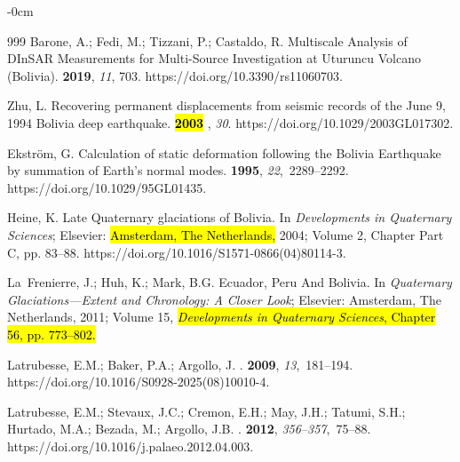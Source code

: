 \documentclass[data,article,accept,pdftex,moreauthors]{Definitions/mdpi}
\begin{document}
{\begin{adjustwidth}{-\extralength}{0cm}
\begin{thebibliography}{999}
Barone, A.; Fedi, M.; Tizzani, P.; Castaldo, R.
\newblock Multiscale Analysis of DInSAR Measurements for Multi-Source
 Investigation at Uturuncu Volcano (Bolivia).
 {\bf 2019}, {\em 11}, 703.
https://doi.org/10.3390/rs11060703.

Zhu, L.
\newblock Recovering permanent displacements from seismic records of the June
 9, 1994 Bolivia deep earthquake.
 {\bf \hl{2003}%
}, {\em 30}. https://doi.org/10.1029/2003GL017302.

Ekström, G.
\newblock Calculation of static deformation following the Bolivia Earthquake by
 summation of Earth's normal modes.
 {\bf 1995}, {\em 22},~2289--2292.
https://doi.org/10.1029/95GL01435.

Heine, K. {Late Quaternary glaciations of Bolivia}.
\newblock In {\em {Developments in Quaternary Sciences}}; Elsevier: \hl{Amsterdam, The Netherlands,} %
2004; Volume 2, Chapter {Part C}, pp. 83--88.
https://doi.org/10.1016/S1571-0866(04)80114-3.

La~Frenierre, J.; Huh, K.; Mark, B.G. Ecuador, Peru And Bolivia.
\newblock In {\em {Quaternary Glaciations---Extent and Chronology: A Closer
 Look}}; Elsevier: Amsterdam, The Netherlands, 2011; Volume 15, \hl{\emph{Developments
 in Quaternary Sciences}, Chapter 56, pp. 773--802.} %

Latrubesse, E.M.; Baker, P.A.; Argollo, J.
.
 {\bf 2009}, {\em
 13},~181--194.
https://doi.org/10.1016/S0928-2025(08)10010-4.

Latrubesse, E.M.; Stevaux, J.C.; Cremon, E.H.; May, J.H.; Tatumi, S.H.;
 Hurtado, M.A.; Bezada, M.; Argollo, J.B.
.
 {\bf 2012},
 {\em 356--357},~75--88.
https://doi.org/10.1016/j.palaeo.2012.04.003.


\end{thebibliography}
\end{adjustwidth}}
\end{document}
